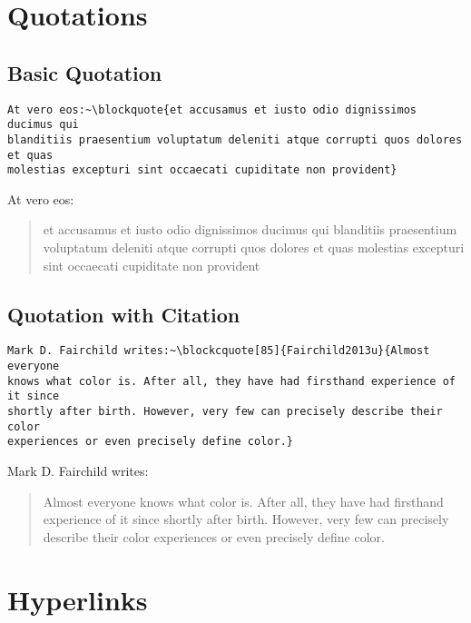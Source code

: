 \section*{Quotations}%
\label{sec:Quotations}

\subsection*{Basic Quotation}%
\label{subsec:basic-quotation}

\begin{lstlisting}[caption={Basic quotation.}]
At vero eos:~\blockquote{et accusamus et iusto odio dignissimos ducimus qui
blanditiis praesentium voluptatum deleniti atque corrupti quos dolores et quas
molestias excepturi sint occaecati cupiditate non provident}
\end{lstlisting}

At vero eos:~\blockquote{et accusamus et iusto odio dignissimos ducimus qui
blanditiis praesentium voluptatum deleniti atque corrupti quos dolores et quas
molestias excepturi sint occaecati cupiditate non provident}

\subsection*{Quotation with Citation}%
\label{subsec:quotation-with-citation}

\begin{lstlisting}[caption={Quotation with Citation.}]
Mark D. Fairchild writes:~\blockcquote[85]{Fairchild2013u}{Almost everyone
knows what color is. After all, they have had firsthand experience of it since
shortly after birth. However, very few can precisely describe their color
experiences or even precisely define color.}
\end{lstlisting}

Mark D. Fairchild writes:~\blockcquote[85]{Fairchild2013u}{Almost everyone
knows what color is. After all, they have had firsthand experience of it since
shortly after birth. However, very few can precisely describe their color
experiences or even precisely define color.}

\section*{Hyperlinks}%
\label{sec:hyperlinks}

